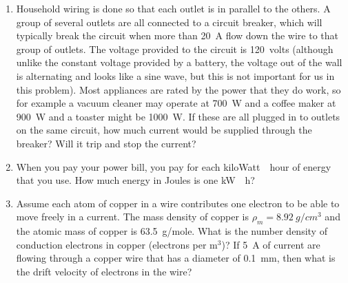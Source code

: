 \begin{enumerate}
   \item
   Household wiring is done so that each outlet is in parallel to the others. A group of several outlets are all connected to a circuit breaker, which will typically break the circuit when more than \SI{20}{\ampere} flow down the wire to that group of outlets. The voltage provided to the circuit is \SI{120}{volts} (although unlike the constant voltage provided by a battery, the voltage out of the wall is alternating and looks like a sine wave, but this is not important for us in this problem). Most appliances are rated by the power that they do work, so for example a vacuum cleaner may operate at \SI{700}{\watt} and a coffee maker at \SI{900}{\watt} and a toaster might be \SI{1000}{\watt}. If these are all plugged in to outlets on the same circuit, how much current would be supplied through the breaker? Will it trip and stop the current?
   
   \item
   When you pay your power bill, you pay for each \si{kiloWatt\cdot hour} of energy that you use. How much energy in \si{Joules} is one \si{\kilo \watt\cdot \hour}?
	
	
	
	
	\item Assume each atom of copper in a wire contributes one electron to be able to move freely in a current. The mass density of copper is $\rho_m = \SI{8.92}{g/cm^3}$ and the atomic mass of copper is \SI{63.5}{g/mole}. What is the number density of conduction electrons in copper (electrons per m$^3$)? If \SI{5}{\ampere} of current are flowing through a copper wire that has a diameter of \SI{0.1}{mm}, then what is the drift velocity of electrons in the wire?



\newpage 

\ %

\newpage

\end{enumerate}